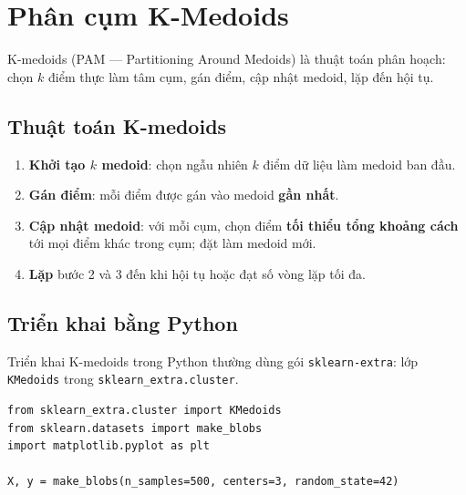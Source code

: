 \section{Phân cụm K-Medoids}
\label{sec:k-medoids}

\begin{dinhnghia}[title={K-medoids}]
K-medoids (PAM --- Partitioning Around Medoids) là thuật toán phân hoạch: chọn $k$ điểm thực làm tâm cụm, gán điểm, cập nhật medoid, lặp đến hội tụ.
\end{dinhnghia}

\subsection{Thuật toán K-medoids}

\begin{phuongphap}[title={Các bước}]
\begin{enumerate}
  \item \textbf{Khởi tạo $k$ medoid}: chọn ngẫu nhiên $k$ điểm dữ liệu làm medoid ban đầu.
  \item \textbf{Gán điểm}: mỗi điểm được gán vào medoid \textbf{gần nhất}.
  \item \textbf{Cập nhật medoid}: với mỗi cụm, chọn điểm \textbf{tối thiểu tổng khoảng cách} tới mọi điểm khác trong cụm; đặt làm medoid mới.
  \item \textbf{Lặp} bước 2 và 3 đến khi hội tụ hoặc đạt số vòng lặp tối đa.
\end{enumerate}
\end{phuongphap}

\subsection{Triển khai bằng Python}

\begin{dongco}[title={Thư viện}]
Triển khai K-medoids trong Python thường dùng gói \texttt{sklearn-extra}: lớp \texttt{KMedoids} trong \texttt{sklearn\_extra.cluster}.
\end{dongco}

\begin{vidu}[title={Import và tạo dữ liệu mẫu}]
\begin{lstlisting}
from sklearn_extra.cluster import KMedoids
from sklearn.datasets import make_blobs
import matplotlib.pyplot as plt

X, y = make_blobs(n_samples=500, centers=3, random_state=42)
\end{lstlisting}
\end{vidu}

